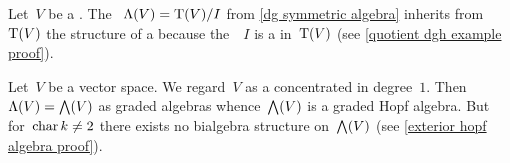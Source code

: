 \documentclass[a4paper,10pt,headings=standardclasses]{scrartcl}
\begin{document}
\begin{example}
  \label{quotient dgh example}
  Let~$V$ be a {\dgv}.
  The {\dga}~$\operatorname{\Lambda}(V) = \operatorname{T}(V)/I$ from \cref{dg symmetric algebra} inherits from~$\operatorname{T}(V)$ the structure of a {\dgh} because the~{\dgi}~$I$ is a {\dghi} in~$\operatorname{T}(V)$ (see \cref{quotient dgh example proof}).
\end{example}

\begin{example}
  \label{exterior hopf algebra}
  Let~$V$ be a vector space.
  We regard~$V$ as a {\dgv} concentrated in degree~$1$.
  Then~$\operatorname{\Lambda}(V) = \bigwedge(V)$ as graded algebras whence~$\bigwedge(V)$ is a graded Hopf algebra.
  But for~$\operatorname{char} k \neq 2$ there exists no bialgebra structure on~$\bigwedge(V)$ (see \cref{exterior hopf algebra proof}).
\end{example}

\pagebreak
\end{document}
